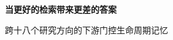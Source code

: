 \documentclass[UTF8,a4paper,zihao=5,fontset=none]{ctexart}
\begin{document}
\thispagestyle{empty}
\begin{center}
  \vspace*{1.35cm}
  {\bfseries{} 当更好的检索带来更差的答案\par}
  \vspace{0.55em}
  { 跨十八个研究方向的下游门控生命周期记忆\par}
\end{center}


\end{document}

